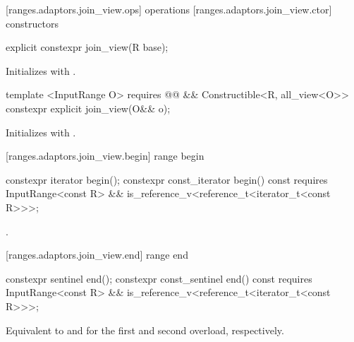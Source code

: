 [ranges.adaptors.join_view.ops]{ operations}
[ranges.adaptors.join_view.ctor]{ constructors}

%
\begin{itemdecl}
explicit constexpr join_view(R base);
\end{itemdecl}

\begin{itemdescr}
\pnum
\effects Initializes  with .
\end{itemdescr}

%
\begin{itemdecl}
template <InputRange O>
  requires @@ &&
      Constructible<R, all_view<O>>
constexpr explicit join_view(O&& o);
\end{itemdecl}

\begin{itemdescr}
\pnum
\effects Initializes  with .
\end{itemdescr}

[ranges.adaptors.join_view.begin]{ range begin}

%
\begin{itemdecl}
constexpr iterator begin();
constexpr const_iterator begin() const requires InputRange<const R> &&
  is_reference_v<reference_t<iterator_t<const R>>>;
\end{itemdecl}

\begin{itemdescr}
\pnum
\returns {}.
\end{itemdescr}

[ranges.adaptors.join_view.end]{ range end}

%
\begin{itemdecl}
constexpr sentinel end();
constexpr const_sentinel end() const requires InputRange<const R> &&
  is_reference_v<reference_t<iterator_t<const R>>>;
\end{itemdecl}

\begin{itemdescr}
\pnum
\effects Equivalent to  and
 for the first and second overload,
respectively.
\end{itemdescr}

